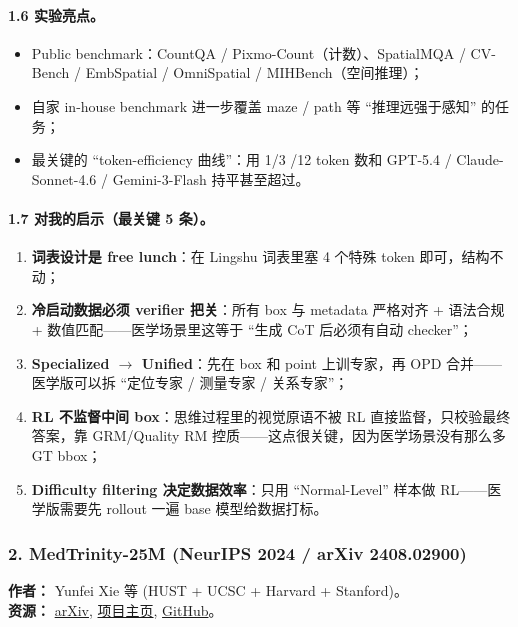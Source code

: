 \paragraph{1.6 实验亮点。}

\begin{itemize}[leftmargin=1.5em]
  \item Public benchmark：CountQA / Pixmo-Count（计数）、SpatialMQA / CV-Bench / EmbSpatial / OmniSpatial / MIHBench（空间推理）；
  \item 自家 in-house benchmark 进一步覆盖 maze / path 等 ``推理远强于感知'' 的任务；
  \item 最关键的 ``token-efficiency 曲线''：用 1/3 /12 token 数和 GPT-5.4 / Claude-Sonnet-4.6 / Gemini-3-Flash 持平甚至超过。
\end{itemize}

\paragraph{1.7 对我的启示（最关键 5 条）。}

\begin{enumerate}[leftmargin=1.5em]
  \item \textbf{词表设计是 free lunch}：在 Lingshu 词表里塞 4 个特殊 token 即可，结构不动；
  \item \textbf{冷启动数据必须 verifier 把关}：所有 box 与 metadata 严格对齐 + 语法合规 + 数值匹配——医学场景里这等于 ``生成 CoT 后必须有自动 checker''；
  \item \textbf{Specialized $\to$ Unified}：先在 box 和 point 上训专家，再 OPD 合并——医学版可以拆 ``定位专家 / 测量专家 / 关系专家''；
  \item \textbf{RL 不监督中间 box}：思维过程里的视觉原语不被 RL 直接监督，只校验最终答案，靠 GRM/Quality RM 控质——这点很关键，因为医学场景没有那么多 GT bbox；
  \item \textbf{Difficulty filtering 决定数据效率}：只用 ``Normal-Level'' 样本做 RL——医学版需要先 rollout 一遍 base 模型给数据打标。
\end{enumerate}

\subsubsection*{2. MedTrinity-25M (NeurIPS 2024 / arXiv 2408.02900)}

\textbf{作者：} Yunfei Xie 等 (HUST + UCSC + Harvard + Stanford)。\\
\textbf{资源：} \href{https://arxiv.org/abs/2408.02900}{arXiv}, \href{https://yunfeixie233.github.io/MedTrinity-25M/}{项目主页}, \href{https://github.com/UCSC-VLAA/MedTrinity-25M}{GitHub}。


